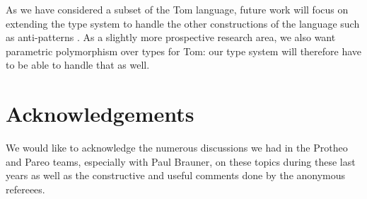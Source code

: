 \documentclass{eptcs}
\newcommand{\tom}{\textsf{Tom}\xspace}
\begin{document}
As we have considered a subset of the \tom language, future work will 
focus on extending the type system to handle the other constructions of the
language such as anti-patterns \cite{KirchnerKM-2007,kopetz:08}. 
As a slightly more prospective research area, we also want parametric polymorphism over types for \tom: our type system will therefore have
to be able to handle that as well.  

\section*{Acknowledgements} We would like to acknowledge the numerous discussions we had
in the Protheo and Pareo teams, especially with Paul Brauner, on these topics during these
last years as well as the constructive and useful comments done by the anonymous
refereees.



\end{document}
